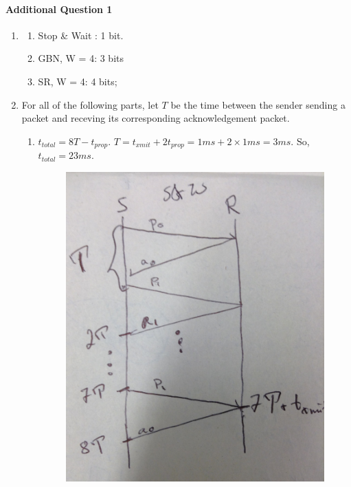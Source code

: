 \documentclass[12pt]{article}
\begin{document}
\paragraph{Additional Question 1}
\begin{enumerate}[label=\textbf{Part \arabic*)},leftmargin=*,align=left]
	\item 
		\begin{enumerate}[label=\textbf{\alph*)}]
			\item Stop \& Wait : 1 bit.
			\item GBN, W = 4: 3 bits
			\item SR, W = 4: 4 bits;
		\end{enumerate}
	\item For all of the following parts, let $T$ be the time between the sender sending a packet and receving its corresponding acknowledgement packet.
		\begin{enumerate}[label=\textbf{\alph*)}]
			\item $t_{total} = 8T - t_{prop}$. $T = t_{xmit} + 2t_{prop} = 1ms + 2 \times 1ms = 3ms$. So, $t_{total} = 23ms$.
				\begin{figure}[H]
					\centering
					\includegraphics[scale=0.1]{SR8}	

\end{figure}
\end{enumerate}
\end{enumerate}
\end{document}
